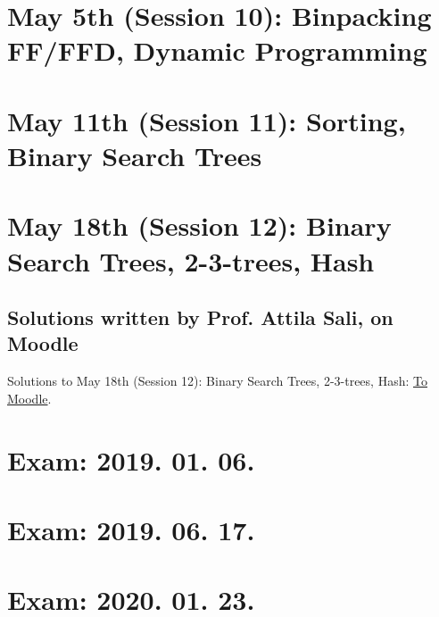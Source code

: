 \documentclass[a4paper]{article}
\begin{document}
\section{May 5th (Session 10): Binpacking FF/FFD, Dynamic Programming}
\pagebreak
\pagebreak
\pagebreak
\pagebreak
\pagebreak
\pagebreak
\pagebreak
\pagebreak
\pagebreak
\pagebreak
\pagebreak
\pagebreak
\pagebreak

\section{May 11th (Session 11): Sorting, Binary Search Trees}
\pagebreak
\pagebreak
\pagebreak
\pagebreak
\pagebreak
\pagebreak
\pagebreak
\pagebreak
\pagebreak
\pagebreak
\pagebreak
\pagebreak
\pagebreak
\pagebreak
\pagebreak

\section{May 18th (Session 12): Binary Search Trees, 2-3-trees, Hash}
\subsection{Solutions written by Prof. Attila Sali, on Moodle}
Solutions to May 18th (Session 12): Binary Search Trees, 2-3-trees, Hash: \href{https://edu.vik.bme.hu/pluginfile.php/325461/mod\_resource/content/1/main.pdf}{To Moodle}.
\pagebreak
\pagebreak

\section{Exam: 2019. 01. 06.}
\pagebreak

\section{Exam: 2019. 06. 17.}
\setcounter{subsection}{3}
\pagebreak

\section{Exam: 2020. 01. 23.}
\setcounter{subsection}{2}
\pagebreak
\end{document}
